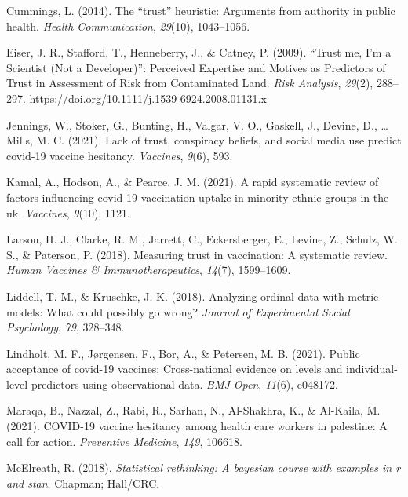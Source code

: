 \documentclass[english,,jou,floatsintext]{apa6}
\begin{document}
\leavevmode\hypertarget{ref-cummings2014trust}{}%
Cummings, L. (2014). The ``trust'' heuristic: Arguments from authority in public health. \emph{Health Communication}, \emph{29}(10), 1043--1056.

\leavevmode\hypertarget{ref-eiser_trust_2009}{}%
Eiser, J. R., Stafford, T., Henneberry, J., \& Catney, P. (2009). ``Trust me, I'm a Scientist (Not a Developer)'': Perceived Expertise and Motives as Predictors of Trust in Assessment of Risk from Contaminated Land. \emph{Risk Analysis}, \emph{29}(2), 288--297. \url{https://doi.org/10.1111/j.1539-6924.2008.01131.x}

\leavevmode\hypertarget{ref-jennings2021lack}{}%
Jennings, W., Stoker, G., Bunting, H., Valgar\dhsson, V. O., Gaskell, J., Devine, D., \ldots{} Mills, M. C. (2021). Lack of trust, conspiracy beliefs, and social media use predict covid-19 vaccine hesitancy. \emph{Vaccines}, \emph{9}(6), 593.

\leavevmode\hypertarget{ref-kamal2021rapid}{}%
Kamal, A., Hodson, A., \& Pearce, J. M. (2021). A rapid systematic review of factors influencing covid-19 vaccination uptake in minority ethnic groups in the uk. \emph{Vaccines}, \emph{9}(10), 1121.

\leavevmode\hypertarget{ref-larson2018measuring}{}%
Larson, H. J., Clarke, R. M., Jarrett, C., Eckersberger, E., Levine, Z., Schulz, W. S., \& Paterson, P. (2018). Measuring trust in vaccination: A systematic review. \emph{Human Vaccines \& Immunotherapeutics}, \emph{14}(7), 1599--1609.

\leavevmode\hypertarget{ref-liddell2018analyzing}{}%
Liddell, T. M., \& Kruschke, J. K. (2018). Analyzing ordinal data with metric models: What could possibly go wrong? \emph{Journal of Experimental Social Psychology}, \emph{79}, 328--348.

\leavevmode\hypertarget{ref-lindholt2021public}{}%
Lindholt, M. F., Jørgensen, F., Bor, A., \& Petersen, M. B. (2021). Public acceptance of covid-19 vaccines: Cross-national evidence on levels and individual-level predictors using observational data. \emph{BMJ Open}, \emph{11}(6), e048172.

\leavevmode\hypertarget{ref-maraqa2021covid}{}%
Maraqa, B., Nazzal, Z., Rabi, R., Sarhan, N., Al-Shakhra, K., \& Al-Kaila, M. (2021). COVID-19 vaccine hesitancy among health care workers in palestine: A call for action. \emph{Preventive Medicine}, \emph{149}, 106618.

\leavevmode\hypertarget{ref-mcelreath2018statistical}{}%
McElreath, R. (2018). \emph{Statistical rethinking: A bayesian course with examples in r and stan}. Chapman; Hall/CRC.
\end{document}
